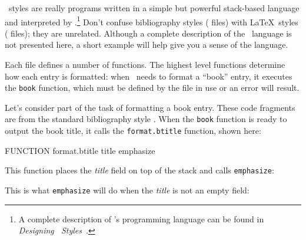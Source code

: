 \BibTeX\ styles are really 
programs written in a simple but powerful
stack-based language and interpreted by \BibTeX.\footnote{A complete
description of \BibTeX's programming language can be found in
\textit{Designing \BibTeX\ Styles}~\cite{op:btxhak}.}  Don't confuse
bibliography styles ( files) 
with \LaTeX\ styles ( files); they are unrelated.  
Although a complete description of the \BibTeX\ language is not presented
here, a short example will help give you a sense of
the language.  

Each  file defines a number of functions. The highest
level functions determine how each entry is formatted: when \BibTeX\
needs to format a ``book'' entry, it executes the \verb|book| function,
which must be defined by the \ext{BST} file in use or an error will
result.

Let's consider part of the task of formatting a book entry.  These code
fragments are from the standard bibliography style \filename{plain.bst}.
When the \verb|book| function is ready to output the book title, it calls
the \verb|format.btitle| function, shown here:

\begin{shortexample}
FUNCTION {format.btitle}
{ title emphasize
}
\end{shortexample}

This function places the \textit{title} field on
top of the stack and calls \verb|emphasize|:


\newpage
This is what \verb|emphasize| will do when the \textit{title}
is not an empty field:

